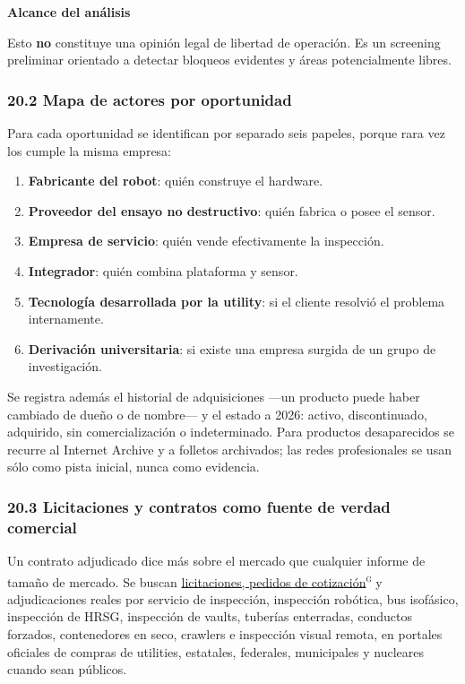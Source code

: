 \documentclass[11pt,a4paper]{article}
\newenvironment{notariesgo}[1]
  {\begin{notariesgobase}{\sffamily\scriptsize\bfseries\color{red}#1}\par\vspace{2pt}}
  {\end{notariesgobase}}
\begin{document}
\begin{notariesgo}{Alcance del análisis}
Esto \textbf{no} constituye una opinión legal de libertad de operación. Es un screening preliminar orientado a detectar bloqueos evidentes y áreas potencialmente libres.

\end{notariesgo}

\subsubsection*{20.2 Mapa de actores por oportunidad}

Para cada oportunidad se identifican por separado seis papeles, porque rara vez los cumple la misma empresa:

\begin{enumerate}
\item \textbf{Fabricante del robot}: quién construye el hardware.
\item \textbf{Proveedor del ensayo no destructivo}: quién fabrica o posee el sensor.
\item \textbf{Empresa de servicio}: quién vende efectivamente la inspección.
\item \textbf{Integrador}: quién combina plataforma y sensor.
\item \textbf{Tecnología desarrollada por la utility}: si el cliente resolvió el problema internamente.
\item \textbf{Derivación universitaria}: si existe una empresa surgida de un grupo de investigación.
\end{enumerate}

Se registra además el historial de adquisiciones —un producto puede haber cambiado de dueño o de nombre— y el estado a 2026: activo, discontinuado, adquirido, sin comercialización o indeterminado. Para productos desaparecidos se recurre al Internet Archive y a folletos archivados; las redes profesionales se usan sólo como pista inicial, nunca como evidencia.


\subsubsection*{20.3 Licitaciones y contratos como fuente de verdad comercial}

Un contrato adjudicado dice más sobre el mercado que cualquier informe de tamaño de mercado. Se buscan \hyperlink{g-licitacion}{licitaciones, pedidos de cotización}\textsuperscript{\textsc{g}} y adjudicaciones reales por servicio de inspección, inspección robótica, bus isofásico, inspección de HRSG, inspección de vaults, tuberías enterradas, conductos forzados, contenedores en seco, crawlers e inspección visual remota, en portales oficiales de compras de utilities, estatales, federales, municipales y nucleares cuando sean públicos.
\end{document}
